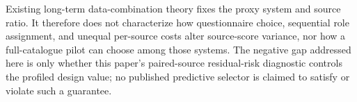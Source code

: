 Existing long-term data-combination theory fixes the proxy system and source ratio.  It therefore does not characterize how questionnaire choice, sequential role assignment, and unequal per-source costs alter source-score variance, nor how a full-catalogue pilot can choose among those systems.  The negative gap addressed here is only whether this paper's paired-source residual-risk diagnostic controls the profiled design value; no published predictive selector is claimed to satisfy or violate such a guarantee.